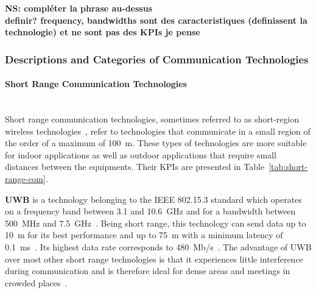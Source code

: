 {\bf NS: compléter la phrase au-dessus\\
  definir? frequency, bandwidths sont des caracteristiques (definissent la technologie) et ne sont pas des KPIs je pense}



\subsubsection{Descriptions and Categories of Communication Technologies}

\paragraph{Short Range Communication Technologies}\ \\
Short range communication technologies, sometimes referred to as short-region wireless technologies~\cite{yu_technology_2018}, refer to technologies that communicate in a small region of the order of a maximum of 100~m. These types of technologies are more suitable for indoor applications as well as outdoor applications that require small distances between the equipments. Their \acrshort{KPI}s are presented in Table~\ref{tab:short-range-com}.

\textbf{\acrfull{UWB}} is a technology belonging to the IEEE 802.15.3 standard which operates on a frequency band between 3.1 and 10.6~GHz and for a bandwidth between 500~MHz and 7.5~GHz~\cite{anwer_survey_2014,ahangar_survey_2021}. Being short range, this technology can send data up to 10~m for its best performance and up to 75~m with a minimum latency of 0.1~ms~\cite{ahangar_survey_2021}. Its highest data rate corresponds to 480~Mb/s~\cite{wang_networking_2019}. The advantage of UWB over most other short range technologies is that it experiences little interference during communication and is therefore ideal for dense areas and meetings in crowded places~\cite{ahangar_survey_2021}. 

